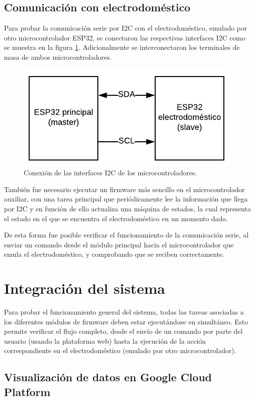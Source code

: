 \subsection{Comunicación con electrodoméstico}

Para probar la comunicación serie por I2C con el electrodoméstico, emulado por otro microcontrolador ESP32, se conectaron las respectivas interfaces I2C como se muestra en la figura \ref{fig:esp32_connection}. Adicionalmente se interconectaron los terminales de masa de ambos microcontroladores.

\begin{figure}[h]
\centering
\includegraphics[scale=1.0]{./Figures/esp32_connection.pdf}
\caption{Conexión de las interfaces I2C de los microcontroladores.}
\label{fig:esp32_connection}
\end{figure}

También fue necesario ejecutar un firmware más sencillo en el microcontrolador auxiliar, con una tarea principal que periódicamente lee la información que llega por I2C y en función de ello actualiza una máquina de estados, la cual representa el estado en el que se encuentra el electrodoméstico en un momento dado.

De esta forma fue posible verificar el funcionamiento de la comunicación serie, al enviar un comando desde el módulo principal hacia el microcontrolador que emula el electrodoméstico, y comprobando que se reciben correctamente.

\section{Integración del sistema}

Para probar el funcionamiento general del sistema, todas las tareas asociadas a los diferentes módulos de firmware deben estar ejecutándose en simultáneo. Esto permite verificar el flujo completo, desde el envío de un comando por parte del usuario (usando la plataforma web) hasta la ejecución de la acción correspondiente en el electrodoméstico (emulado por otro microcontrolador).

\subsection{Visualización de datos en Google Cloud Platform}
























